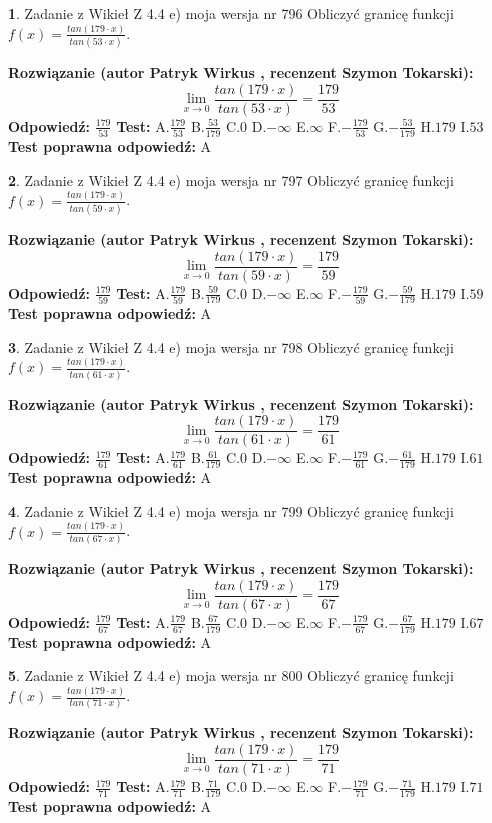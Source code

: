 \documentclass[12pt, a4paper]{article}
\theoremstyle{definition} %
\newtheorem{zad}{}
\newcommand{\zadStart}[1]{\begin{zad}#1\newline}
\newcommand{\zadStop}{\end{zad}}
\newcommand{\rozwStart}[2]{\noindent \textbf{Rozwiązanie (autor #1 , recenzent #2): }\newline}
\newcommand{\rozwStop}{\newline}
\newcommand{\odpStart}{\noindent \textbf{Odpowiedź:}\newline}
\newcommand{\odpStop}{\newline}
\newcommand{\testStart}{\noindent \textbf{Test:}\newline}
\newcommand{\testStop}{\newline}
\newcommand{\kluczStart}{\noindent \textbf{Test poprawna odpowiedź:}\newline}
\newcommand{\kluczStop}{\newline}
\begin{document}
\zadStart{Zadanie z Wikieł Z 4.4 e) moja wersja nr 796}
Obliczyć granicę funkcji $f(x)=\frac{tan(179\cdot x)}{tan(53\cdot x)}$.
\zadStop
\rozwStart{Patryk Wirkus}{Szymon Tokarski}
$$\lim\limits_{x\to 0}\frac{tan(179\cdot x)}{tan(53\cdot x)}=
\frac{179}{53}$$
\rozwStop
\odpStart
$\frac{179}{53}$
\odpStop
\testStart
A.$\frac{179}{53}$
B.$\frac{53}{179}$
C.$0$
D.$-\infty$
E.$\infty$
F.$-\frac{179}{53}$
G.$-\frac{53}{179}$
H.$179$
I.$53$
\testStop
\kluczStart
A
\kluczStop



\zadStart{Zadanie z Wikieł Z 4.4 e) moja wersja nr 797}
Obliczyć granicę funkcji $f(x)=\frac{tan(179\cdot x)}{tan(59\cdot x)}$.
\zadStop
\rozwStart{Patryk Wirkus}{Szymon Tokarski}
$$\lim\limits_{x\to 0}\frac{tan(179\cdot x)}{tan(59\cdot x)}=
\frac{179}{59}$$
\rozwStop
\odpStart
$\frac{179}{59}$
\odpStop
\testStart
A.$\frac{179}{59}$
B.$\frac{59}{179}$
C.$0$
D.$-\infty$
E.$\infty$
F.$-\frac{179}{59}$
G.$-\frac{59}{179}$
H.$179$
I.$59$
\testStop
\kluczStart
A
\kluczStop



\zadStart{Zadanie z Wikieł Z 4.4 e) moja wersja nr 798}
Obliczyć granicę funkcji $f(x)=\frac{tan(179\cdot x)}{tan(61\cdot x)}$.
\zadStop
\rozwStart{Patryk Wirkus}{Szymon Tokarski}
$$\lim\limits_{x\to 0}\frac{tan(179\cdot x)}{tan(61\cdot x)}=
\frac{179}{61}$$
\rozwStop
\odpStart
$\frac{179}{61}$
\odpStop
\testStart
A.$\frac{179}{61}$
B.$\frac{61}{179}$
C.$0$
D.$-\infty$
E.$\infty$
F.$-\frac{179}{61}$
G.$-\frac{61}{179}$
H.$179$
I.$61$
\testStop
\kluczStart
A
\kluczStop



\zadStart{Zadanie z Wikieł Z 4.4 e) moja wersja nr 799}
Obliczyć granicę funkcji $f(x)=\frac{tan(179\cdot x)}{tan(67\cdot x)}$.
\zadStop
\rozwStart{Patryk Wirkus}{Szymon Tokarski}
$$\lim\limits_{x\to 0}\frac{tan(179\cdot x)}{tan(67\cdot x)}=
\frac{179}{67}$$
\rozwStop
\odpStart
$\frac{179}{67}$
\odpStop
\testStart
A.$\frac{179}{67}$
B.$\frac{67}{179}$
C.$0$
D.$-\infty$
E.$\infty$
F.$-\frac{179}{67}$
G.$-\frac{67}{179}$
H.$179$
I.$67$
\testStop
\kluczStart
A
\kluczStop



\zadStart{Zadanie z Wikieł Z 4.4 e) moja wersja nr 800}
Obliczyć granicę funkcji $f(x)=\frac{tan(179\cdot x)}{tan(71\cdot x)}$.
\zadStop
\rozwStart{Patryk Wirkus}{Szymon Tokarski}
$$\lim\limits_{x\to 0}\frac{tan(179\cdot x)}{tan(71\cdot x)}=
\frac{179}{71}$$
\rozwStop
\odpStart
$\frac{179}{71}$
\odpStop
\testStart
A.$\frac{179}{71}$
B.$\frac{71}{179}$
C.$0$
D.$-\infty$
E.$\infty$
F.$-\frac{179}{71}$
G.$-\frac{71}{179}$
H.$179$
I.$71$
\testStop
\kluczStart
A
\kluczStop
\end{document}
